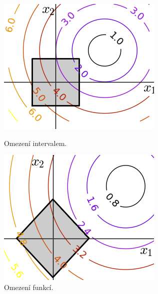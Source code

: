 \begin{figure}[!tbp]
\begin{minipage}[b]{0.450\linewidth}
\includegraphics[width=\linewidth]{obrazky-figures/box_constraint.png}
\caption{Omezení intervalem.}
\label{fig:BoxConstraint}
\end{minipage}
\hfill
\begin{minipage}[b]{0.450\linewidth}
\includegraphics[width=\linewidth]{obrazky-figures/general_constraint.png}
\caption{Omezení funkcí.}
\label{fig:GeneralConstraint}
\end{minipage}
\end{figure}

